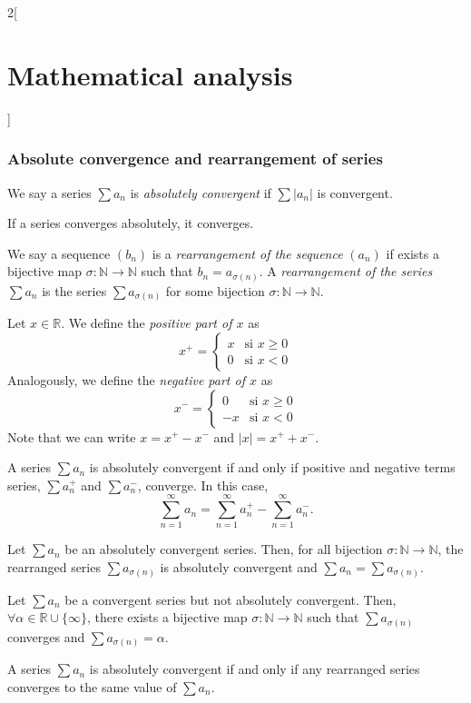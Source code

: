 \documentclass[class=article,crop=false]{standalone}
\begin{document}
\begin{multicols}{2}[\section{Mathematical analysis}]
\subsubsection*{Absolute convergence and rearrangement of series}
\begin{definition}
We say a series $\sum a_n$ is \textit{absolutely convergent} if $\sum |a_n|$ is convergent.
\end{definition}
\begin{theorem}
If a series converges absolutely, it converges.
\end{theorem}
\begin{definition}
We say a sequence $(b_n)$ is a \textit{rearrangement of the sequence} $(a_n)$ if exists a bijective map $\sigma:\mathbb{N}\rightarrow\mathbb{N}$ such that $b_n=a_{\sigma(n)}$. A \textit{rearrangement of the series} $\sum a_n$ is the series $\sum a_{\sigma(n)}$ for some bijection $\sigma:\mathbb{N}\rightarrow\mathbb{N}$.
\end{definition}
\begin{definition}
Let $x\in\mathbb{R}$. We define the \textit{positive part of $x$} as $$x^+=
\begin{cases} 
  x & \text{si }x\geq 0 \\
  0 & \text{si }x<0 
\end{cases}$$ Analogously, we define the \textit{negative part of $x$} as $$x^-=
\begin{cases} 
  0 & \text{si }x\geq 0 \\
  -x & \text{si }x<0 
\end{cases}$$ Note that we can write $x=x^+-x^-$ and $|x|=x^++x^-$.
\end{definition}
\begin{theorem}
A series $\sum a_n$ is absolutely convergent if and only if positive and negative terms series, $\sum a_n^+$ and $\sum a_n^-$, converge. In this case, $$\sum_{n=1}^\infty a_n=\sum_{n=1}^\infty a_n^+-\sum_{n=1}^\infty a_n^-.$$
\end{theorem}
\begin{theorem}
Let $\sum a_n$ be an absolutely convergent series. Then, for all bijection $\sigma:\mathbb{N}\rightarrow\mathbb{N}$, the rearranged series $\sum a_{\sigma(n)}$ is absolutely convergent and $\sum a_n=\sum a_{\sigma(n)}$.
\end{theorem}
\begin{theorem}
Let $\sum a_n$ be a convergent series but not absolutely convergent. Then, $\forall\alpha\in\mathbb{R}\cup\{\infty\}$, there exists a bijective map $\sigma:\mathbb{N}\rightarrow\mathbb{N}$ such that $\sum a_{\sigma(n)}$ converges and $\sum a_{\sigma(n)}=\alpha$.
\end{theorem}
\begin{theorem}
A series $\sum a_n$ is absolutely convergent if and only if any rearranged series converges to the same value of $\sum a_n$.
\end{theorem}

\end{multicols}
\end{document}
